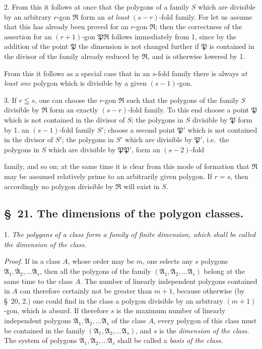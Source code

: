 \documentclass{article}
\begin{document}
2. From this it follows at once that the polygons of a family $S$ which are divisible by an arbitrary $r$-gon $\mathfrak{R}$ form an \emph{at least} $(s-r)$-fold family. For let us assume that this has already been proved for an $r$-gon $\mathfrak{R}$; then the correctness of the assertion for an $(r+1)$-gon $\mathfrak{P}\mathfrak{R}$ follows immediately from 1, since by the addition of the point $\mathfrak{P}$ the dimension is not changed further if $\mathfrak{P}$ is contained in the divisor of the family already reduced by $\mathfrak{R}$, and is otherwise lowered by 1.

From this it follows as a special case that in an $s$-fold family there is always \emph{at least one} polygon which is divisible by a given $(s-1)$-gon.

3. If $r \leqq s$, one can choose the $r$-gon $\mathfrak{R}$ such that the polygons of the family $S$ divisible by $\mathfrak{R}$ form an exactly $(s-r)$-fold family. To this end choose a point $\mathfrak{P}$ which is not contained in the divisor of $S$; the polygons in $S$ divisible by $\mathfrak{P}$ form by 1. an $(s-1)$-fold family $S'$; choose a second point $\mathfrak{P}'$ which is not contained in the divisor of $S'$; the polygons in $S'$ which are divisible by $\mathfrak{P}'$, i.e.\ the polygons in $S$ which are divisible by $\mathfrak{P}\mathfrak{P}'$, form an $(s-2)$-fold

family, and so on; at the same time it is clear from this mode of formation that $\mathfrak{R}$ may be assumed relatively prime to an arbitrarily given polygon. If $r = s$, then accordingly no polygon divisible by $\mathfrak{R}$ will exist in $S$.

\subsection*{§~21. The dimensions of the polygon classes.}

1. \emph{The polygons of a class form a family of finite dimension, which shall be called the dimension of the class.}

\emph{Proof.} If in a class $A$, whose order may be $m$, one selects any $s$ polygons $\mathfrak{A}_{1}, \mathfrak{A}_{2}, \ldots \mathfrak{A}_{s}$, then all the polygons of the family $(\mathfrak{A}_{1}, \mathfrak{A}_{2}, \ldots \mathfrak{A}_{s})$ belong at the same time to the class $A$. The number of linearly independent polygons contained in $A$ can therefore certainly not be greater than $m+1$, because otherwise (by §~20, 2.) one could find in the class a polygon divisible by an arbitrary $(m+1)$-gon, which is absurd. If therefore $s$ is the maximum number of linearly independent polygons $\mathfrak{A}_{1}, \mathfrak{A}_{2}, \ldots \mathfrak{A}_{s}$ of the class $A$, every polygon of this class must be contained in the family $(\mathfrak{A}_{1}, \mathfrak{A}_{2}, \ldots \mathfrak{A}_{s})$, and $s$ is the \emph{dimension of the class.} The system of polygons $\mathfrak{A}_{1}, \mathfrak{A}_{2}, \ldots \mathfrak{A}_{s}$ shall be called a \emph{basis of the class}.
\end{document}
